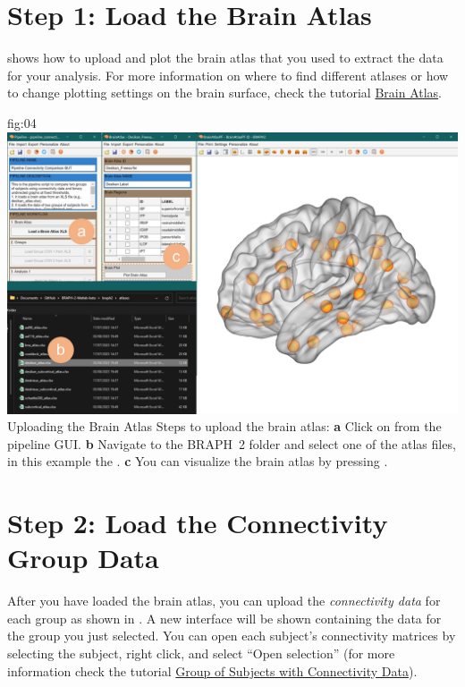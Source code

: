 \documentclass[justified]{tufte-handout}
\begin{document}

\clearpage
\section{Step 1: Load the Brain Atlas}

 shows how to upload and plot the brain atlas that you used to extract the data for your analysis. For more information on where to find different atlases or how to change plotting settings on the brain surface, check the tutorial \href{https://github.com/braph-software/BRAPH-2/tree/develop/tutorials/data/tut_ba}{Brain Atlas}.

{fig:04}
{
	\includegraphics{fig04.jpg}
}
{Uploading the Brain Atlas}
{
	Steps to upload the brain atlas:
	{\bf a} Click on  from the pipeline GUI.
	{\bf b} Navigate to the BRAPH~2 folder  and select one of the atlas files, in this example the . 
	{\bf c} You can visualize the brain atlas by pressing . 
}

 
\clearpage
\section{Step 2: Load the Connectivity Group Data}

After you have loaded the brain atlas, you can upload the \emph{connectivity data} for each group as shown in . A new interface will be shown containing the data for the group you just selected. You can open each subject’s connectivity matrices by selecting the subject, right click, and select “Open selection” (for more information check the tutorial \href{https://github.com/braph-software/BRAPH-2/tree/develop/tutorials/data/tut_gr_con}{Group of Subjects with Connectivity Data}).
\end{document}
